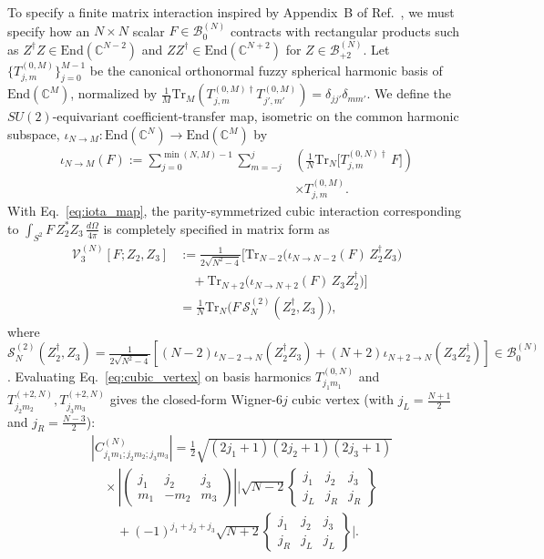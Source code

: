 \documentclass[onecolumn,11pt,aps,prd,amsmath,amssymb,nofootinbib,floatfix]{revtex4-2}
\newcommand{\calB}{\mathcal{B}}
\newcommand{\Tr}{\mathrm{Tr}}
\begin{document}
To specify a finite matrix interaction inspired by Appendix~B of Ref.~\cite{Chandrasekaran2026}, we must specify how an $N\times N$ scalar $F\in\calB_0^{(N)}$ contracts with rectangular products such as $Z^\dagger Z\in\mathrm{End}(\mathbb{C}^{N-2})$ and $Z Z^\dagger\in\mathrm{End}(\mathbb{C}^{N+2})$ for $Z\in\calB_{+2}^{(N)}$. Let $\{T^{(0,M)}_{j,m}\}_{j=0}^{M-1}$ be the canonical orthonormal fuzzy spherical harmonic basis of $\mathrm{End}(\mathbb{C}^M)$, normalized by $\frac{1}{M}\Tr_M(T^{(0,M)\dagger}_{j,m}T^{(0,M)}_{j',m'})=\delta_{jj'}\delta_{mm'}$. We define the $SU(2)$-equivariant coefficient-transfer map, isometric on the common harmonic subspace, $\iota_{N\to M}:\mathrm{End}(\mathbb{C}^N)\to\mathrm{End}(\mathbb{C}^M)$ by
\begin{align}\label{eq:iota_map}
\iota_{N\to M}(F) := \sum_{j=0}^{\min(N,M)-1}\sum_{m=-j}^{j}\!&\left(\frac{1}{N}\Tr_N\!\big[T^{(0,N)\dagger}_{j,m}\,F\big]\right) \nonumber\\
&\times T^{(0,M)}_{j,m}.
\end{align}
With Eq.~\eqref{eq:iota_map}, the parity-symmetrized cubic interaction corresponding to $\int_{S^2} F\,Z_2^* Z_3\,\frac{d\Omega}{4\pi}$ is completely specified in matrix form as
\begin{align}\label{eq:cubic_vertex}
\mathcal{V}_3^{(N)}[F;Z_2,Z_3]
&:= \frac{1}{2\sqrt{N^2-4}}\Big[\Tr_{N-2}\!\big(\iota_{N\to N-2}(F)\,Z_2^\dagger Z_3\big) \nonumber\\
&\quad + \Tr_{N+2}\!\big(\iota_{N\to N+2}(F)\,Z_3 Z_2^\dagger\big)\Big] \nonumber\\
&= \frac{1}{N}\Tr_N\!\big(F\,\mathcal{S}_N^{(2)}(Z_2^\dagger,Z_3)\big),
\end{align}
where $\mathcal{S}_N^{(2)}(Z_2^\dagger,Z_3)=\frac{1}{2\sqrt{N^2-4}}[(N-2)\iota_{N-2\to N}(Z_2^\dagger Z_3)+(N+2)\iota_{N+2\to N}(Z_3 Z_2^\dagger)]\in\calB_0^{(N)}$. Evaluating Eq.~\eqref{eq:cubic_vertex} on basis harmonics $T^{(0,N)}_{j_1 m_1}$ and $T^{(+2,N)}_{j_2 m_2},T^{(+2,N)}_{j_3 m_3}$ gives the closed-form Wigner-$6j$ cubic vertex (with $j_L=\frac{N+1}{2}$ and $j_R=\frac{N-3}{2}$):
\begin{align}\label{eq:wigner6j}
&|C^{(N)}_{j_1 m_1;j_2 m_2;j_3 m_3}|
= \frac{1}{2}\sqrt{(2j_1+1)(2j_2+1)(2j_3+1)} \nonumber\\
&\quad\times \left|\begin{pmatrix}j_1&j_2&j_3\\m_1&-m_2&m_3\end{pmatrix}\right|
\Bigg|\sqrt{N-2}\begin{Bmatrix}j_1&j_2&j_3\\j_L&j_R&j_R\end{Bmatrix} \nonumber\\
&\qquad + (-1)^{j_1+j_2+j_3}\sqrt{N+2}\begin{Bmatrix}j_1&j_2&j_3\\j_R&j_L&j_L\end{Bmatrix}\Bigg|.
\end{align}
\end{document}
